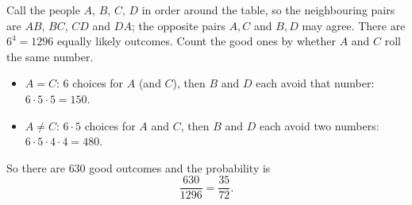 Call the people $A$, $B$, $C$, $D$ in order around the table, so the neighbouring pairs are $AB$, $BC$, $CD$ and $DA$; the opposite pairs $A,C$ and $B,D$ may agree. There are $6^4=1296$ equally likely outcomes. Count the good ones by whether $A$ and $C$ roll the same number.
\begin{itemize}
\item $A=C$: $6$ choices for $A$ (and $C$), then $B$ and $D$ each avoid that number: $6\cdot5\cdot5=150$.
\item $A\ne C$: $6\cdot5$ choices for $A$ and $C$, then $B$ and $D$ each avoid two numbers: $6\cdot5\cdot4\cdot4=480$.
\end{itemize}
So there are $630$ good outcomes and the probability is
\[
\dfrac{630}{1296}=\boxed{\dfrac{35}{72}}.
\]
